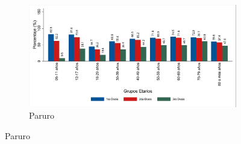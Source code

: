 \documentclass[12pt,a4paper,openany]{book}
\begin{document}
\begin{figure}[h]
		\vspace{3mm}
		\begin{subfigure}[b]{0.63\textwidth}
			\centering
			\includegraphics[width=\textwidth]{../figuras/vacunacion__provincias_10.pdf}
			\caption{Paruro}
		\end{subfigure}
	\end{figure}
	
\end{document}
